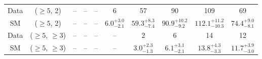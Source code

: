 \begin{table}[h!]
{\begin{tabular}{cccccccccc}
	Data & ($\ge5$, 2) & -- & -- & -- & 6 & 57 & 90 & 109 & 69 \\[0.5ex] 
	SM & ($\ge5$, 2) & -- & -- & -- & $6.0^{+ 3.0 }_{- 2.1 }$ & $59.3^{+ 8.3 }_{- 7.4 }$ & $90.9^{+ 10.2 }_{- 9.2 }$ & $112.1^{+ 11.2 }_{- 10.3 }$ & $74.4^{+ 9.0 }_{- 8.1 }$ \\[0.5ex] 
	Data & ($\ge5$, $\ge3$) & -- & -- & -- & -- & 2 & 6 & 14 & 12 \\[0.5ex] 
	SM & ($\ge5$, $\ge3$) & -- & -- & -- & -- & $3.0^{+ 2.3 }_{- 1.3 }$ & $6.1^{+ 3.1 }_{- 2.1 }$ & $13.8^{+ 4.3 }_{- 3.3 }$ & $11.7^{+ 3.9 }_{- 3.0 }$ \\[0.5ex] 
	\hline
	\hline
\end{tabular}}
\end{table}
